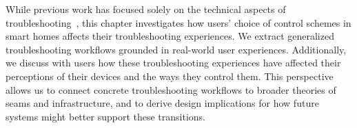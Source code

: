While previous work has focused solely on the technical aspects of troubleshooting~\cite{muller2011collecting, alves2018homenetrescue}, this chapter investigates how users' choice of control schemes in smart homes affects their troubleshooting experiences. We extract generalized troubleshooting workflows grounded in real-world user experiences. Additionally, we discuss with users how these troubleshooting experiences have affected their perceptions of their devices and the ways they control them. {This perspective allows us to connect concrete troubleshooting workflows to broader theories of seams and infrastructure, and to derive design implications for how future systems might better support these transitions.}

